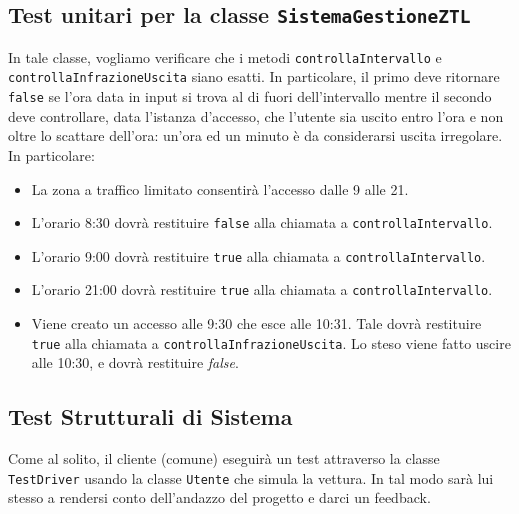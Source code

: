 \documentclass[12pt, letterpaper]{article}
\begin{document}
\subsection{Test unitari per la classe
\texttt{SistemaGestioneZTL}}
In tale classe, vogliamo verificare che 
i metodi \texttt{controllaIntervallo} e
\texttt{controllaInfrazioneUscita} siano 
esatti. In particolare, il primo deve 
ritornare \texttt{false} se l'ora data 
in input si trova al di fuori dell'intervallo 
mentre il secondo deve controllare, data
l'istanza d'accesso, che l'utente sia uscito
entro l'ora e non oltre lo scattare dell'ora:
un'ora ed un minuto è da considerarsi uscita 
irregolare.
In particolare:
\begin{itemize}
    \item La zona a traffico limitato consentirà 
    l'accesso dalle 9 alle 21. 
    \item L'orario 8:30 dovrà 
    restituire \texttt{false} alla chiamata
    a \texttt{controllaIntervallo}.
    \item L'orario 9:00 dovrà 
    restituire \texttt{true} alla chiamata
    a \texttt{controllaIntervallo}.
    \item L'orario 21:00 dovrà 
    restituire \texttt{true} alla chiamata
    a \texttt{controllaIntervallo}.
    \item Viene creato un accesso 
    alle 9:30 che esce alle 10:31.
    Tale dovrà restituire 
    \texttt{true} alla chiamata a 
    \texttt{controllaInfrazioneUscita}.
    Lo steso viene fatto uscire alle 
    10:30, e dovrà restituire 
    \emph{false}.
\end{itemize}

\subsection{Test Strutturali di Sistema}
Come al solito, il cliente (comune) eseguirà 
un test attraverso la classe \texttt{TestDriver}
usando la classe \texttt{Utente} che simula la 
vettura. In tal modo sarà lui stesso a rendersi 
conto dell'andazzo del progetto e darci un 
feedback.
\end{document}
